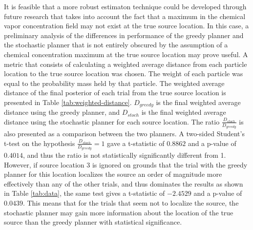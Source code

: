 \documentclass[submit, 12pt]{aiaa-pretty-modified}
\begin{document}
It is feasible that a more robust estimaton technique could be developed through
future research that takes into account the fact that a maximum in the
chemical vapor concentration field may not exist at the true source
location.  In this case, a preliminary analysis of the
differences in performance of the greedy planner and the
stochastic planner that is not entirely obscured by the assumption of a chemical
concentration maximum at the true source location may prove useful.  A
metric that consists of calculating a
weighted average distance from each particle location to the true
source location was chosen.  The weight of each particle was equal to the
probability mass held by that particle.  The weighted average distance
of the final posterior of each trial from the true source location is
presented in Table \ref{tab:weighted-distance}.  $D_{greedy}$ is the final
weighted average distance using the greedy planner, and
$D_{stoch}$ is the final weighted average distance using the
stochastic planner for each source location.  The ratio
$\frac{D_{stoch}}{D_{greedy}}$ is also presented as a comparison
between the two planners.  A two-sided Student's t-test on the
hypothesis $\frac{D_{stoch}}{D_{greedy}} = 1$ gave a t-statistic of
$0.8862$ and a p-value of $0.4014$, and thus the ratio is not
statistically significantly different from 1.  However, if source
location 3 is ignored on grounds that the trial with the greedy
planner for this location localizes the source an order of magnitude
more effectively than any of the other trials, and thus dominates the results as shown in
Table \ref{tab:data}, the same test
gives a t-statistic of $-2.4529$ and a p-value
of $0.0439$.  This means that for the trials that seem not to
localize the source, the stochastic planner may gain more information
about the location of the true source than the greedy planner with
statistical significance.

\begin{table}[htb]
\centering
{}
\caption[Probabilistically weighted distance from the posterior estimate to the
source location]{Weighted distance of the posterior particle distribution from the true
  source location. The weighted distance is the average of the distances from
  each particle location to the source location weighted by the probability
  mass of the posterior held by that particle.}
\label{tab:weighted-distance}
\end{table}
\end{document}
